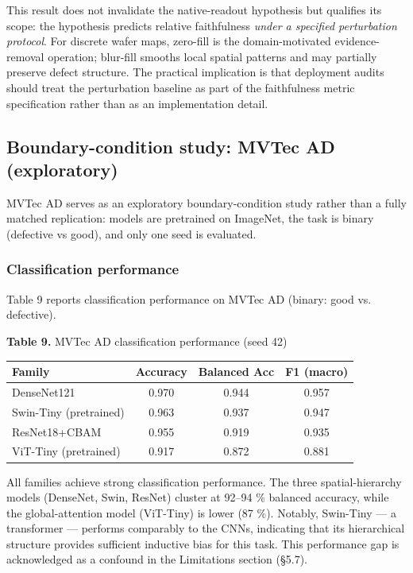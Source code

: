 \documentclass[11pt,a4paper]{article}
\begin{document}
This result does not invalidate the native-readout hypothesis but qualifies its scope: the hypothesis predicts relative faithfulness \emph{under a specified perturbation protocol}. For discrete wafer maps, zero-fill is the domain-motivated evidence-removal operation; blur-fill smooths local spatial patterns and may partially preserve defect structure. The practical implication is that deployment audits should treat the perturbation baseline as part of the faithfulness metric specification rather than as an implementation detail.

\subsection{Boundary-condition study: MVTec AD (exploratory)}

MVTec AD serves as an exploratory boundary-condition study rather than a fully matched replication: models are pretrained on ImageNet, the task is binary (defective vs good), and only one seed is evaluated.

\subsubsection{Classification performance}

Table 9 reports classification performance on MVTec AD (binary: good vs. defective).

\begin{center}
\small \textbf{Table 9.} MVTec AD classification performance (seed 42)
\end{center}

\begin{tabular}{lccc}
\toprule
Family & Accuracy & Balanced Acc & F1 (macro) \\
\midrule
DenseNet121 & 0.970 & 0.944 & 0.957 \\
Swin-Tiny (pretrained) & 0.963 & 0.937 & 0.947 \\
ResNet18+CBAM & 0.955 & 0.919 & 0.935 \\
ViT-Tiny (pretrained) & 0.917 & 0.872 & 0.881 \\
\bottomrule
\end{tabular}


All families achieve strong classification performance. The three spatial-hierarchy models (DenseNet, Swin, ResNet) cluster at 92--94 \% balanced accuracy, while the global-attention model (ViT-Tiny) is lower (87 \%). Notably, Swin-Tiny --- a transformer --- performs comparably to the CNNs, indicating that its hierarchical structure provides sufficient inductive bias for this task. This performance gap is acknowledged as a confound in the Limitations section (\S{}5.7).
\end{document}
